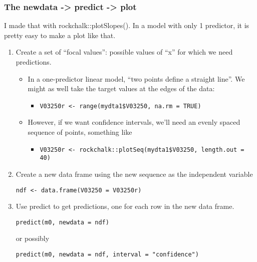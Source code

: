 \documentclass[10pt,english]{beamer}
\begin{document}
\begin{frame}
\frametitle{The newdata -> predict -> plot }

I made that with rockchalk::plotSlopes(). In a model with only 1 predictor,
it is pretty easy to make a plot like that.
\begin{enumerate}
\item Create a set of ``focal values'': possible values of ``x'' for
which we need predictions. 

\begin{itemize}
\item In a one-predictor linear model, ``two points define a straight line''.
We might as well take the target values at the edges of the data: 

\begin{itemize}
\item {}
\begin{lstlisting}
V03250r <- range(mydta1$V03250, na.rm = TRUE)
\end{lstlisting}
\end{itemize}
\item However, if we want confidence intervals, we'll need an evenly spaced
sequence of points, something like

\begin{itemize}
\item {}
\begin{lstlisting}
V03250r <- rockchalk::plotSeq(mydta1$V03250, length.out = 40)	
\end{lstlisting}
\end{itemize}
\end{itemize}
\item Create a new data frame using the new sequence as the independent
variable


\begin{lstlisting}
ndf <- data.frame(V03250 = V03250r)
\end{lstlisting}

\item Use predict to get predictions, one for each row in the new data frame.


\begin{lstlisting}
predict(m0, newdata = ndf)
\end{lstlisting}


or possibly


\begin{lstlisting}
predict(m0, newdata = ndf, interval = "confidence")
\end{lstlisting}

\end{enumerate}
\end{frame}
\end{document}
